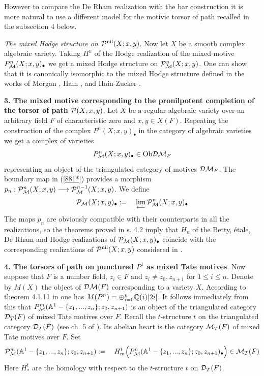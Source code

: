 \documentclass[10pt]{article}
\begin{document}
However to compare the De Rham realization with the bar construction it is more natural to use 
a different model for the motivic torsor of path recalled in the subsection  4 below. 

{\it The mixed Hodge structure on ${\cal P}^{\rm nil}(X; x,y)$}. 
Now let $X$ be a smooth 
complex algebraic variety. Taking $H^n$ of the 
Hodge realization of the 
mixed motive $P^n_{\cal M}(X; x,y)_{\bullet}$ we get a 
 mixed Hodge structure on ${\cal P}^n_{\cal M}(X; x,y)$. 
One can show that it is canonically isomorphic to the  mixed Hodge structure
defined in the works of Morgan \cite{M}, Hain \cite{H}, \cite{H1} and  
Hain-Zucker \cite{HZ}. 

{\bf 3. The mixed motive corresponding to the pronilpotent completion of the torsor of path 
${\cal P}(X; x,y)$}. Let $X$ be a regular algebraic variety over an arbitrary field 
$F$ of characteristic zero and $x,y \in X(F)$. Repeating the construction of the complex 
$P^n(X; x,y)_{\bullet}$ in the category of algebraic varieties we get a complex 
of varieties 
$$
P^n_{\cal M}(X; x,y)_{\bullet} \in {\rm Ob}{\cal D}{\cal M}_F
$$
representing an object of the triangulated category of motives 
${\cal D}{\cal M}_F$. 
The boundary map in (\ref{881*}) provides a morphism $p_n: 
{\cal P}^n_{\cal M}(X; x,y) \longrightarrow 
{\cal P}^{n-1}_{\cal M}(X; x,y)$. We define 
$$
{\cal P}_{\cal M}(X; x,y)_{\bullet}:= \quad \lim_{\longleftarrow}
{\cal P}^n_{\cal M}(X; x,y)_{\bullet}
$$
The maps $p_n$ are obviously compatible with their counterparts in all 
the realizations, so the theorems proved in s. 4.2 imply that $H_n$ of the 
Betty, \'etale, De Rham and Hodge realizations 
of ${\cal P}_{\cal M}(X; x,y)_{\bullet}$ coincide with the corresponding 
realizations of ${\cal P}^{\rm nil}(X; x,y)$ considered in \cite{D}. 


{\bf 4. The torsors of path on punctured $P^1$ as mixed Tate motives}. 
 Now suppose that $F$ is a number field, $z_i \in F$ and 
$z_i \not = z_0, z_{n+1}$ for $1 \leq i \leq n$. 
Denote by $M(X)$ the object of ${\cal D}{\cal M}(F)$ corresponding to a variety $X$. According to theorem 4.1.11 in \cite{V} one has 
$M(P^n) = \oplus_{i=0}^n {\mathbb Q}(i)[2i]$. It follows immediately from this that 
${P}^{m}_{\cal M}({\mathbb A}^1 - \{z_1, ..., z_n\}; z_0, z_{n+1})$ is 
an object of the triangulated category  ${\cal D}_T(F)$
of mixed Tate motives over $F$. Recall  
the $t$-structure $t$ on the triangulated category ${\cal D}_T(F)$ (see  ch.
 5 of \cite{G8}). Its 
abelian heart 
is the category ${\cal M}_T(F)$ of mixed Tate motives over $F$. Set 
$$
{\cal P}^{m}_{\cal M}({\mathbb A}^1 - \{z_1, ..., z_n\}; z_0, z_{n+1}):= \quad 
H^t_{m}\Bigl( {P}^{n}_{\cal M}({\mathbb A}^1 - \{z_1, ..., z_n\}; z_0, z_{n+1})_{\bullet}\Bigr) \in {\cal M}_T(F)
$$ 
Here $H_*^t$ are the homology 
with respect to the $t$-structure $t$ on ${\cal D}_T(F)$. 
\end{document}

